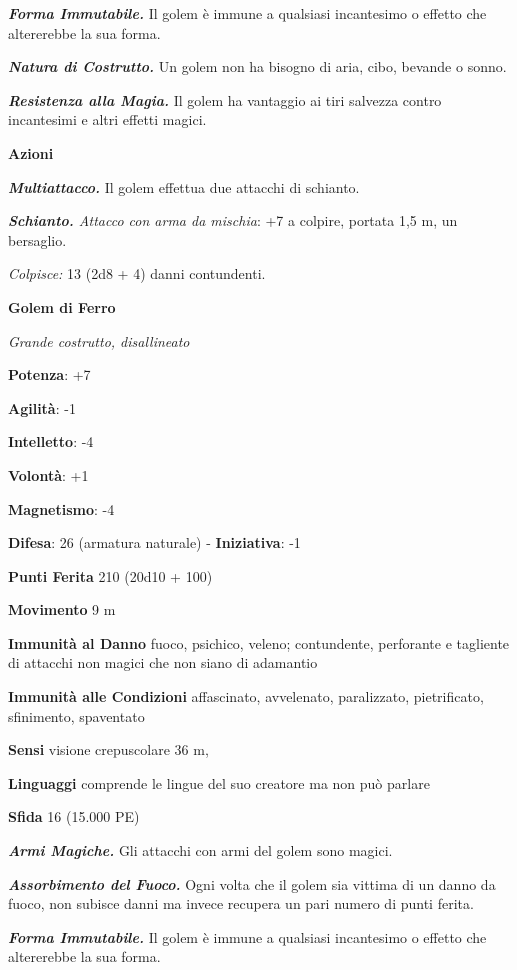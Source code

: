 \begin{multicols}{2}
\emph{\textbf{Forma Immutabile.}} Il golem è immune a qualsiasi
incantesimo o effetto che altererebbe la sua forma.

\emph{\textbf{Natura di Costrutto.}} Un golem non ha bisogno di aria,
cibo, bevande o sonno.

\emph{\textbf{Resistenza alla Magia.}} Il golem ha vantaggio ai tiri
salvezza contro incantesimi e altri effetti magici.

\textbf{Azioni}

\emph{\textbf{Multiattacco.}} Il golem effettua due attacchi di
schianto.

\emph{\textbf{Schianto.} Attacco con arma da mischia}: +7 a colpire,
portata 1,5 m, un bersaglio.

\emph{Colpisce:} 13 (2d8 + 4) danni contundenti.



\textbf{Golem di Ferro}

\emph{Grande costrutto, disallineato}

\textbf{Potenza}: +7

\textbf{Agilità}: -1

\textbf{Intelletto}: -4

\textbf{Volontà}: +1

\textbf{Magnetismo}: -4

\textbf{Difesa}: 26 (armatura naturale) - \textbf{Iniziativa}: -1

\textbf{Punti Ferita} 210 (20d10 + 100)

\textbf{Movimento} 9 m

\textbf{Immunità al Danno} fuoco, psichico, veleno; contundente,
perforante e tagliente di attacchi non magici che non siano di adamantio

\textbf{Immunità alle Condizioni} affascinato, avvelenato, paralizzato,
pietrificato, sfinimento, spaventato

\textbf{Sensi} visione crepuscolare 36 m, 

\textbf{Linguaggi} comprende le lingue del suo creatore ma non può
parlare

\textbf{Sfida} 16 (15.000 PE)

\emph{\textbf{Armi Magiche.}} Gli attacchi con armi del golem sono
magici.

\emph{\textbf{Assorbimento del Fuoco.}} Ogni volta che il golem sia
vittima di un danno da fuoco, non subisce danni ma invece recupera un
pari numero di punti ferita.

\emph{\textbf{Forma Immutabile.}} Il golem è immune a qualsiasi
incantesimo o effetto che altererebbe la sua forma.


\end{multicols}
